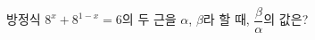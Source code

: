 방정식 $8^{x}+8^{1-x}=6$의 두 근을 $\alpha$, $\beta$라 할 때, $\dfrac{\beta}{\alpha}$의 값은? \dmcondfill{$\alpha<\beta$}{}
